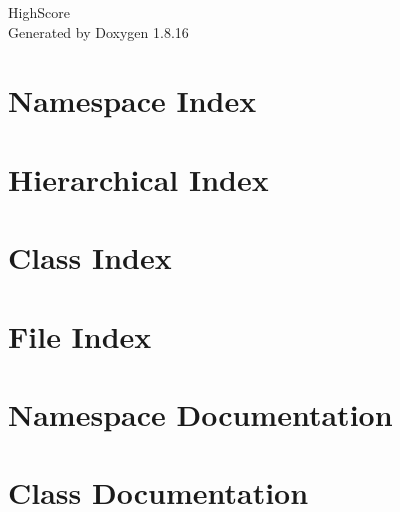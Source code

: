 \let\mypdfximage\pdfximage\def\pdfximage{\immediate\mypdfximage}\documentclass[twoside]{book}
\newcommand{\+}{\discretionary{\mbox{\scriptsize$\hookleftarrow$}}{}{}}
\newcommand{\clearemptydoublepage}{%
  \newpage{\pagestyle{empty}\cleardoublepage}%
}
\begin{document}
\hypersetup{pageanchor=false,
             bookmarksnumbered=true,
             pdfencoding=unicode
            }
\begin{titlepage}
\vspace*{7cm}
\begin{center}%
{\Large High\+Score }\\
\vspace*{1cm}
{\large Generated by Doxygen 1.8.16}\\
\end{center}
\end{titlepage}
\clearemptydoublepage
{}
\tableofcontents
\clearemptydoublepage
{}
\hypersetup{pageanchor=true}

\chapter{Namespace Index}

\chapter{Hierarchical Index}

\chapter{Class Index}

\chapter{File Index}

\chapter{Namespace Documentation}



\chapter{Class Documentation}





















\end{document}
